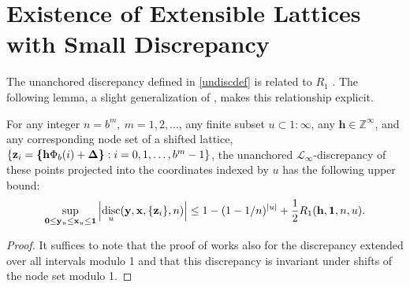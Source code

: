 \documentclass{article}
\renewcommand{\vec}[1]{\ensuremath{\mathbf{#1}}}
\newcommand{\vecsym}[1]{\ensuremath{\boldsymbol{#1}}}
\def\bbl{\text{\boldmath$\{$}}
\def\bbr{\text{\boldmath$\}$}}
\newcommand{\bbrace}[1]{\bbl #1 \bbr}
\def\abs#1{\ensuremath{\left \lvert #1 \right \rvert}}
\DeclareMathOperator{\disc}{disc}
\newcommand{\one}{\vecsym 1}
\newcommand{\bfDelta}{\vecsym \Delta}
\newcommand{\Linf}{{\mathcal L}_{\infty}}
\newcommand{\zero}{{\bf 0}}
\renewcommand{\k}{\vec k}
\newcommand{\h}{\vec h}
\renewcommand{\l}{\vec l}
\newcommand{\x}{\vec x}
\newcommand{\y}{\vec y}
\newcommand{\z}{\vec z}
\newcommand{\bfnu}{\vecsym \nu}
\newcommand{\bflam}{\vecsym \lambda}
\newcommand{\Z}{\mathbb{Z}}
\newcommand{\tZu}{\tilde{\Z}^{u}}
\newcommand{\tZun}{\tilde{\Z}^{u}_{n}}
\begin{document}
\section{Existence of Extensible Lattices with 
Small Discrepancy}

The unanchored discrepancy defined in \eqref{undiscdef} is related to
$R_{1}$ \cite[Chapter 5]{Nie92}.  The following lemma, a slight
generalization of \cite[Theorem 3.10 and Theorem 5.6]{Nie92}, makes
this relationship explicit.  

\begin{lemma} \label{RDlem} For any integer $n=b^{m}, \ m=1,2,\ldots$,
any finite subset $u \subset 1:\infty$, any $\h \in \Z^{\infty}$, and
any corresponding node set of a shifted lattice, $\{\z_{i} = \bbrace{\h
\Phi_{b}(i) + \bfDelta} : i=0,1, \ldots, b^{m}-1\}$, the unanchored
$\Linf$-discrepancy of these points projected into the coordinates
indexed by $u$ has the following upper bound:
\begin{equation*}
    \sup_{\zero \le \y_{u} \le \x_{u} \le \one} \abs{
    \disc_{u}(\y,\x, \{\z_{i}\},n)} \le 1 - (1-1/n)^{\abs{u}} + \frac 12
    R_{1}(\h,\one,n,u).
\end{equation*}
\end{lemma}
\begin{proof} It suffices to note that the proof of \cite[Theorem 3.10]{Nie92} works also for the discrepancy extended over all intervals modulo 1 and 
that this discrepancy is invariant under shifts of the node set modulo 1.
\end{proof}
\end{document}
